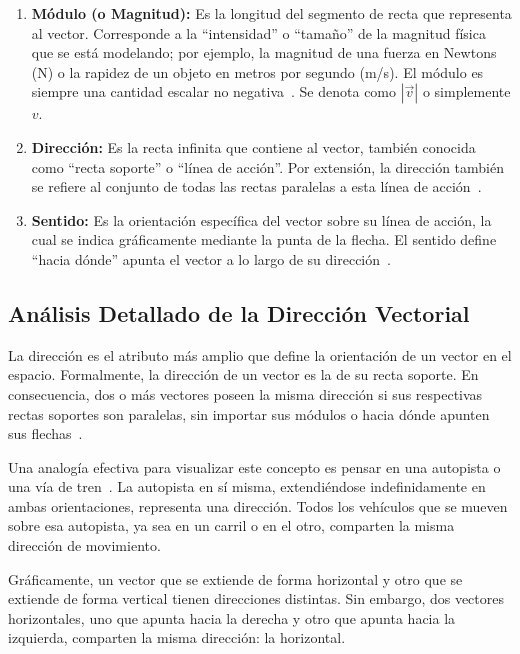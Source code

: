 \documentclass[12pt,a4paper]{article}
\begin{document}
\begin{enumerate}
\item \textbf{Módulo (o Magnitud):} Es la longitud del segmento de recta que representa al vector. Corresponde a la ``intensidad'' o ``tamaño'' de la magnitud física que se está modelando; por ejemplo, la magnitud de una fuerza en Newtons (N) o la rapidez de un objeto en metros por segundo (m/s). El módulo es siempre una cantidad escalar no negativa~\cite{grossman2012}. Se denota como $|\vec{v}|$ o simplemente $v$.

\item \textbf{Dirección:} Es la recta infinita que contiene al vector, también conocida como ``recta soporte'' o ``línea de acción''. Por extensión, la dirección también se refiere al conjunto de todas las rectas paralelas a esta línea de acción~\cite{kolman2006}.

\item \textbf{Sentido:} Es la orientación específica del vector sobre su línea de acción, la cual se indica gráficamente mediante la punta de la flecha. El sentido define ``hacia dónde'' apunta el vector a lo largo de su dirección~\cite{fernandez_coronado}.
\end{enumerate}

\subsection{Análisis Detallado de la Dirección Vectorial} \label{subsec:direccion}

La dirección es el atributo más amplio que define la orientación de un vector en el espacio. Formalmente, la dirección de un vector es la de su recta soporte. En consecuencia, dos o más vectores poseen la misma dirección si sus respectivas rectas soportes son paralelas, sin importar sus módulos o hacia dónde apunten sus flechas~\cite{superprof_vectores}.

Una analogía efectiva para visualizar este concepto es pensar en una autopista o una vía de tren~\cite{fastercapital}. La autopista en sí misma, extendiéndose indefinidamente en ambas orientaciones, representa una dirección. Todos los vehículos que se mueven sobre esa autopista, ya sea en un carril o en el otro, comparten la misma dirección de movimiento.

Gráficamente, un vector que se extiende de forma horizontal y otro que se extiende de forma vertical tienen direcciones distintas. Sin embargo, dos vectores horizontales, uno que apunta hacia la derecha y otro que apunta hacia la izquierda, comparten la misma dirección: la horizontal.
\end{document}
